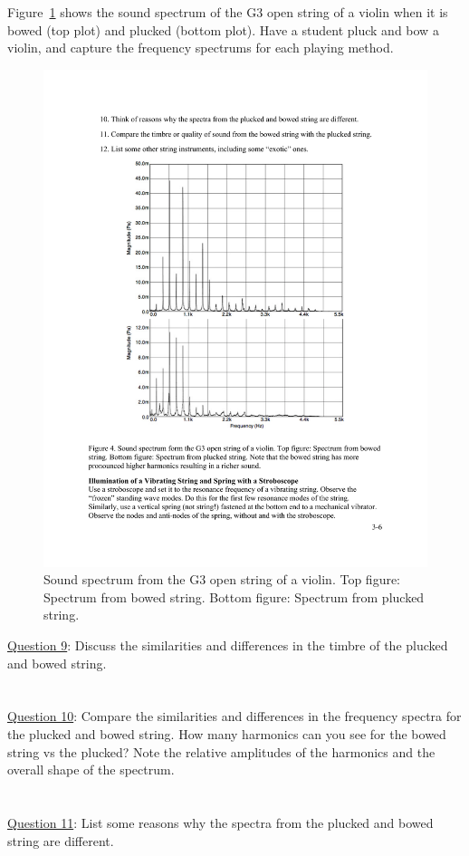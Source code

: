 \documentclass[11pt]{NSF}
\begin{document}
Figure~\ref{f:4} shows the sound  spectrum of the G3 open string of a violin
when it is bowed (top plot) and plucked (bottom plot). Have a student pluck and bow a violin, and capture the frequency spectrums for each playing method.\\
%
\begin{figure}[hbtp] 
\begin{center} 
\includegraphics[width=.7\textwidth]{fig3_4}
\caption{Sound spectrum from the G3 open string of a violin. 
Top figure: Spectrum from bowed string. 
Bottom figure: Spectrum from plucked string.}
\label{f:4} 
\end{center} 
\end{figure}
%

\underline{Question 9}: Discuss the similarities and differences in the timbre of the plucked and bowed string. 
\\
\\
\\

\underline{Question 10}: Compare the similarities and differences in the frequency spectra for the plucked and bowed string. 
How many harmonics can you see for the bowed string vs the plucked? 
Note the relative amplitudes of the harmonics and the overall shape of the spectrum.
\\
\\
\\

\underline{Question 11}: List some reasons why the spectra from the plucked and bowed string are different.
\\
\\
\\
\end{document}
